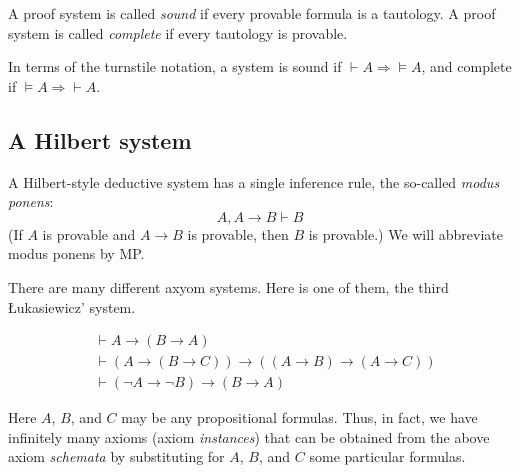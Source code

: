 \begin{page}
\setcounter{section}{2}
\setcounter{subsection}{1}
\setcounter{dfn}{3}
\label{portion:423}

\begin{dfn}
A proof system is called \emph{sound} if every provable formula is a tautology.
A proof system is called \emph{complete} if every tautology is provable.
\end{dfn}

\end{page}

\begin{page}
\setcounter{section}{2}
\setcounter{subsection}{2}
\setcounter{dfn}{3}
\label{portion:424}


In terms of the turnstile notation, a system is sound if $\vdash A \Rightarrow  \vDash A$, and complete if $\vDash A \Rightarrow \vdash A$.



\end{page}

\begin{page}
\setcounter{section}{2}
\setcounter{subsection}{2}
\setcounter{dfn}{3}
\label{portion:425}

\subsection{A Hilbert system}
A Hilbert-style deductive system has a single inference rule, the so-called \emph{modus ponens}:
\[
A, A \to B \vdash B
\]
(If $A$ is provable and $A \to B$ is provable, then $B$ is provable.)
We will abbreviate modus ponens by MP.

There are many different axyom systems.
Here is one of them, the third \L{}ukasiewicz' system.

\begin{align*}
&\vdash A \to (B \to A)\\
&\vdash (A \to (B \to C)) \to ((A \to B) \to (A \to C))\\
&\vdash (\neg A \to \neg B) \to (B \to A)
\end{align*}

Here $A$, $B$, and $C$ may be any propositional formulas.
Thus, in fact, we have infinitely many axioms (axiom \emph{instances}) that can be obtained from the above axiom \emph{schemata}
by substituting for $A$, $B$, and $C$ some particular formulas.


\end{page}

